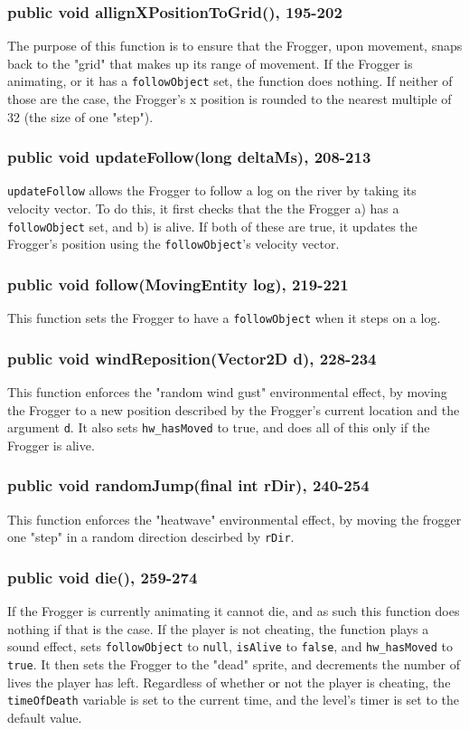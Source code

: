 \documentclass[12pt]{article}
\begin{document}
\subsubsection{public void allignXPositionToGrid(), 195-202}
The purpose of this function is to ensure that the Frogger, upon movement, snaps back to the "grid" that makes up its range of movement.
If the Frogger is animating, or it has a \verb|followObject| set, the function does nothing.
If neither of those are the case, the Frogger's x position is rounded to the nearest multiple of 32 (the size of one "step").

\subsubsection{public void updateFollow(long deltaMs), 208-213}
\verb|updateFollow| allows the Frogger to follow a log on the river by taking its velocity vector.
To do this, it first checks that the the Frogger a) has a \verb|followObject| set, and b) is alive.
If both of these are true, it updates the Frogger's position using the \verb|followObject|'s velocity vector.

\subsubsection{public void follow(MovingEntity log), 219-221}
This function sets the Frogger to have a \verb|followObject| when it steps on a log.

\subsubsection{public void windReposition(Vector2D d), 228-234}
This function enforces the "random wind gust" environmental effect, by moving the Frogger to a new position described by the Frogger's current location and the argument \verb|d|.
It also sets \verb|hw_hasMoved| to true, and does all of this only if the Frogger is alive.

\subsubsection{public void randomJump(final int rDir), 240-254}
This function enforces the "heatwave" environmental effect, by moving the frogger one "step" in a random direction descirbed by \verb|rDir|.

\subsubsection{public void die(), 259-274}
If the Frogger is currently animating it cannot die, and as such this function does nothing if that is the case.
If the player is not cheating, the function plays a sound effect, sets \verb|followObject| to \verb|null|, \verb|isAlive| to \verb|false|, and \verb|hw_hasMoved| to \verb|true|.
It then sets the Frogger to the "dead" sprite, and decrements the number of lives the player has left.
Regardless of whether or not the player is cheating, the \verb|timeOfDeath| variable is set to the current time, and the level's timer is set to the default value.
\end{document}
